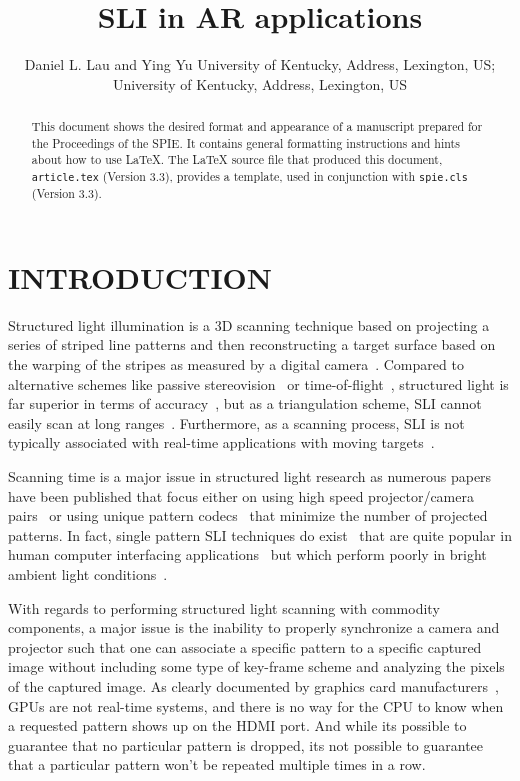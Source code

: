 \documentclass[]{spie}  %
\title{SLI in AR applications}
\author{Daniel L. Lau\supit{a} and Ying Yu\supit{b}
\skiplinehalf
\supit{a}University of Kentucky, Address, Lexington, US; \\
\supit{b}University of Kentucky, Address, Lexington, US
}
\begin{document}
 
  \maketitle 

\begin{abstract}
This document shows the desired format and appearance of a manuscript prepared for the Proceedings of the SPIE.  It contains general formatting instructions and hints about how to use LaTeX.  The LaTeX source file that produced this document, {\tt article.tex} (Version 3.3), provides a template, used in conjunction with {\tt spie.cls} (Version 3.3).  
\end{abstract}



\section{INTRODUCTION}
\label{sec:intro}  %
Structured light illumination is a 3D scanning technique based on projecting a series of striped line patterns and then reconstructing a target surface based on the warping of the stripes as measured by a digital camera~\cite{lieb05}.  Compared to alternative schemes like passive stereovision~\cite{curl96} or time-of-flight~\cite{gokt04}, structured light is far superior in terms of accuracy~\cite{lijl03}, but as a triangulation scheme, SLI cannot easily scan at long ranges~\cite{anyt16}.  Furthermore, as a scanning process, SLI is not typically associated with real-time applications with moving targets~\cite{deet17}.

Scanning time is a major issue in structured light research as numerous papers have been published that focus either on using high speed projector/camera pairs~\cite{gong10} or using unique pattern codecs~\cite{zhan04, suwh06,liuk10} that minimize the number of projected patterns. In fact, single pattern SLI techniques do exist~\cite{take83, wust91, koni06} that are quite popular in human computer interfacing applications~\cite{guan05} but which perform poorly in bright ambient light conditions~\cite{yuan12}. 

With regards to performing structured light scanning with commodity components, a major issue is the inability to properly synchronize a camera and projector such that one can associate a specific pattern to a specific captured image without including some type of key-frame scheme and analyzing the pixels of the captured image. As clearly documented by graphics card manufacturers~\cite{nvid18}, GPUs are not real-time systems, and there is no way for the CPU to know when a requested pattern shows up on the HDMI port. And while its possible to guarantee that no particular pattern is dropped, its not possible to guarantee that a particular pattern won't be repeated multiple times in a row.
\end{document}
